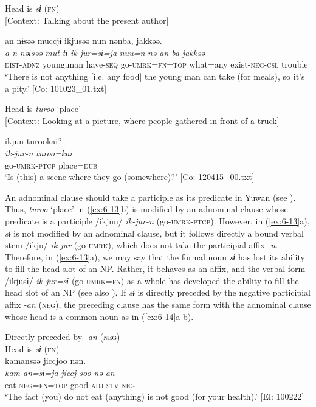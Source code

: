 \ea\label{ex:6-13}
\ea Head is \textit{sɨ} (\textsc{fn})\\{}
[Context: Talking about the present author]

{\TM}
\glll an  nɨsəə  muccjɨ  ikjusəə  nun  nənba,  jakkəə.\\
\textit{a-n}  \textit{nəɨsəə}  \textit{mut-tɨ}  \textit{ik-jur=sɨ=ja}  \textit{nuu=n}   \textit{nə-an-ba}  \textit{jakkəə}\\
    \textsc{dist}-\textsc{adnz}  young.man  have-\textsc{seq}  go-\textsc{umrk}=\textsc{fn}=\textsc{top}  what=any    exist-\textsc{neg}-\textsc{csl}  trouble\\
\glt    ‘There is not anything [i.e. any food] the young man can take (for meals), so it’s a pity.’ [Co: 101023\_01.txt]

\ex Head is \textit{turoo} ‘place’\\{}
  [Context: Looking at a picture, where people gathered in front of a truck]

{\TM}
\glll ikjun  turookai?\\
\textit{ik-jur-n}  \textit{turoo=kai}\\
    go-\textsc{umrk}-\textsc{ptcp}  place=\textsc{dub}\\
\glt    ‘Is (this) a scene where they go (somewhere)?’ [Co: 120415\_00.txt]
\z
\z

An adnominal clause should take a participle as its predicate in Yuwan (see ). Thus, \textit{turoo} ‘place’ in (\ref{ex:6-13}b) is modified by an adnominal clause whose predicate is a participle /ikjun/ \textit{ik-jur-n} (go-\textsc{umrk}-\textsc{ptcp}). However, in (\ref{ex:6-13}a), \textit{sɨ} is not modified by an adnominal clause, but it follows directly a bound verbal stem /ikju/ \textit{ik-jur} (go-\textsc{umrk}), which does not take the participial affix \textit{-n}. Therefore, in (\ref{ex:6-13}a), we may say that the formal noun \textit{sɨ} has lost its ability to fill the head slot of an NP. Rather, it behaves as an affix, and the verbal form /ikjusɨ/ \textit{ik-jur=sɨ} (go-\textsc{umrk}=\textsc{fn}) as a whole has developed the ability to fill the head slot of an NP (see also ). If \textit{sɨ} is directly preceded by the negative participial affix \textit{-an} (\textsc{neg}), the preceding clause has the same form with the adnominal clause whose head is a common noun as in (\ref{ex:6-14}a-b).

\ea\label{ex:6-14}
 Directly preceded by \textit{-an} (\textsc{neg})\\
 \ea Head is \textit{sɨ} (\textsc{fn})\\
{\TM}
\glll  kamansəə  jiccjoo  nən.\\
\textit{kam-an=sɨ=ja}  \textit{jiccj-soo}  \textit{nə-an}\\
eat-\textsc{neg}=\textsc{fn}=\textsc{top}  good-\textsc{adj}  \textsc{stv}-\textsc{neg}\\
\glt ‘The fact (you) do not eat (anything) is not good (for your health).’ [El: 100222]

